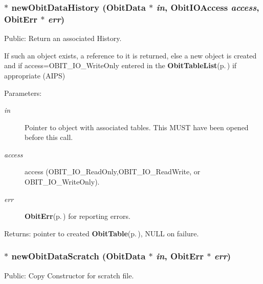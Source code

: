 \subsubsection{$\ast$ new\-Obit\-Data\-History ({\bf Obit\-Data} $\ast$ {\em in}, Obit\-IOAccess {\em access}, {\bf Obit\-Err} $\ast$ {\em err})}\label{ObitData_8h_a42}


Public: Return an associated History. 

If such an object exists, a reference to it is returned, else a new object is created and if access=OBIT\_\-IO\_\-Write\-Only entered in the {\bf Obit\-Table\-List}{\rm (p.\,\pageref{structObitTableList})} if appropriate (AIPS) \begin{Desc}
\item[Parameters:]
\begin{description}
\item[{\em in}]Pointer to object with associated tables. This MUST have been opened before this call. \item[{\em access}]access (OBIT\_\-IO\_\-Read\-Only,OBIT\_\-IO\_\-Read\-Write, or OBIT\_\-IO\_\-Write\-Only). \item[{\em err}]{\bf Obit\-Err}{\rm (p.\,\pageref{structObitErr})} for reporting errors. \end{description}
\end{Desc}
\begin{Desc}
\item[Returns:]pointer to created {\bf Obit\-Table}{\rm (p.\,\pageref{structObitTable})}, NULL on failure. \end{Desc}
\subsubsection{$\ast$ new\-Obit\-Data\-Scratch ({\bf Obit\-Data} $\ast$ {\em in}, {\bf Obit\-Err} $\ast$ {\em err})}\label{ObitData_8h_a29}


Public: Copy Constructor for scratch file. 

